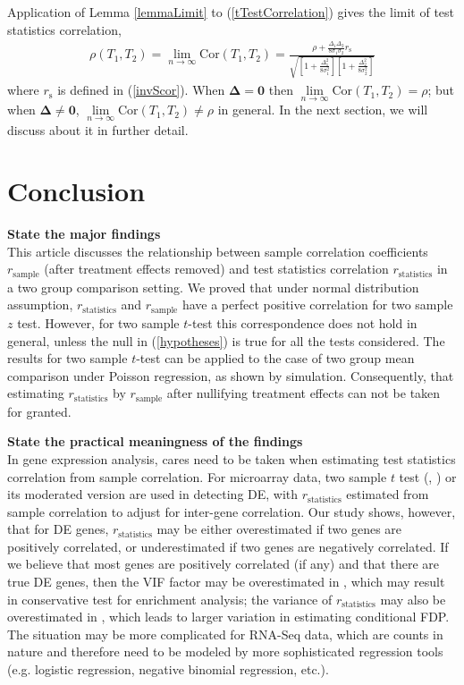 \documentclass[11pt, a4paper]{article}
\begin{document}
Application of Lemma \ref{lemmaLimit} to (\ref{tTestCorrelation}) gives the limit of test statistics correlation, 
\begin{align}\label{limitT}
\rho(T_1, T_2)=\lim\limits_{n \rightarrow \infty} \text{Cor}(T_1, T_2) = \frac{\rho + \frac{\Delta_1\Delta_2}{8\sigma_1\sigma_2}r_{\text{s}}}{\sqrt{  \left[ 1 + \frac{\Delta_1^2}{8\sigma_1^2}\right]\left[ 1 + \frac{\Delta_2^2}{8\sigma_2^2}\right]}}
\end{align}
where $r_{\text{s}}$ is defined in (\ref{invScor}). When $\bm \Delta = \bm 0$ then $\lim\limits_{n \rightarrow \infty} \text{Cor}(T_1, T_2) = \rho$; but when $\bm \Delta \neq \bm 0$, $\lim\limits_{n \rightarrow \infty} \text{Cor}(T_1, T_2) \neq \rho$ in general. In the next section, we will discuss about it in further detail. 




\section{Conclusion}

\textbf{State the major findings} \\
This article discusses the relationship between sample correlation coefficients $r_{\text{sample}}$  (after treatment effects removed) and test statistics correlation $r_\text{statistics}$ in a two group comparison setting. We proved that under normal distribution assumption, $r_\text{statistics}$ and $r_\text{sample}$ have a perfect positive correlation for two sample $z$ test. However, for two sample $t$-test this correspondence does not hold in general, unless the null in (\ref{hypotheses}) is true for all the tests considered. The results for two sample $t$-test can be applied to the case of two group mean comparison under Poisson regression, as shown by simulation. Consequently, that estimating  $r_\text{statistics}$ by $r_{\text{sample}}$ after nullifying treatment effects can not be taken for granted.

\textbf{State the practical meaningness of the findings}\\
In gene expression analysis, cares need to be taken when estimating test statistics correlation from sample correlation. For microarray data, two sample $t$ test (\cite{efron2007correlation}, \cite{barry2008statistical}) or its moderated version \citep{wu2012camera} are used in detecting DE, with $r_\text{statistics}$  estimated from sample correlation to adjust for inter-gene correlation. Our study shows, however, that for DE genes, $r_\text{statistics}$ may be either overestimated if two genes are positively correlated, or underestimated if two genes are negatively correlated. If we believe that most genes are positively correlated (if any) and that there are true DE genes, then the VIF factor may be overestimated in \cite{wu2012camera}, which may result in conservative test for enrichment analysis; the variance of  $r_\text{statistics}$ may also be overestimated in \cite{efron2007correlation}, which leads to larger variation in estimating conditional FDP. The situation may be more complicated for RNA-Seq data, which are counts in nature and therefore need to be modeled by more sophisticated regression tools (e.g. logistic regression, negative binomial regression, etc.). 
 
\end{document}
